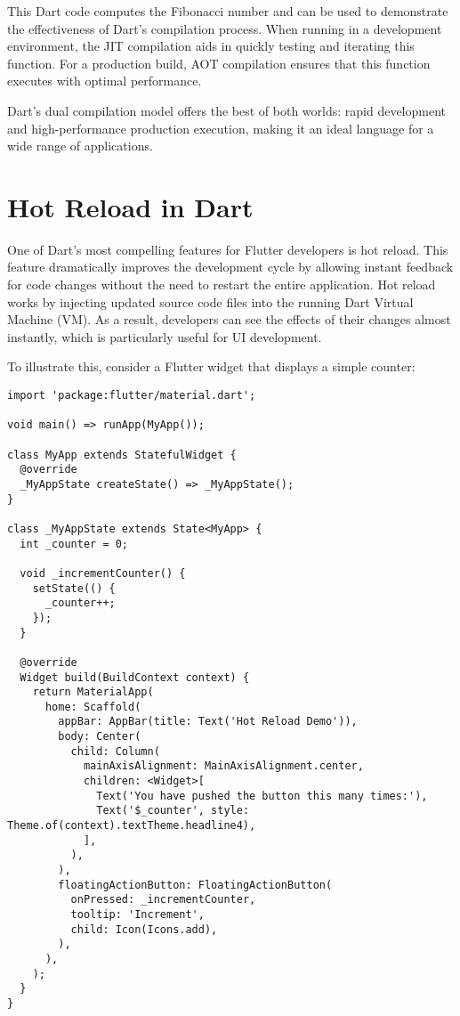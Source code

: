 \documentclass{book}
\begin{document}
This Dart code computes the Fibonacci number and can be used to demonstrate the effectiveness of Dart's compilation process. When running in a development environment, the JIT compilation aids in quickly testing and iterating this function. For a production build, AOT compilation ensures that this function executes with optimal performance.

Dart's dual compilation model offers the best of both worlds: rapid development and high-performance production execution, making it an ideal language for a wide range of applications.



\chapter{Hot Reload in Dart}

One of Dart's most compelling features for Flutter developers is hot reload. This feature dramatically improves the development cycle by allowing instant feedback for code changes without the need to restart the entire application. Hot reload works by injecting updated source code files into the running Dart Virtual Machine (VM). As a result, developers can see the effects of their changes almost instantly, which is particularly useful for UI development.

To illustrate this, consider a Flutter widget that displays a simple counter:

\begin{lstlisting}[style=dartstyle]
import 'package:flutter/material.dart';

void main() => runApp(MyApp());

class MyApp extends StatefulWidget {
  @override
  _MyAppState createState() => _MyAppState();
}

class _MyAppState extends State<MyApp> {
  int _counter = 0;

  void _incrementCounter() {
    setState(() {
      _counter++;
    });
  }

  @override
  Widget build(BuildContext context) {
    return MaterialApp(
      home: Scaffold(
        appBar: AppBar(title: Text('Hot Reload Demo')),
        body: Center(
          child: Column(
            mainAxisAlignment: MainAxisAlignment.center,
            children: <Widget>[
              Text('You have pushed the button this many times:'),
              Text('$_counter', style: Theme.of(context).textTheme.headline4),
            ],
          ),
        ),
        floatingActionButton: FloatingActionButton(
          onPressed: _incrementCounter,
          tooltip: 'Increment',
          child: Icon(Icons.add),
        ),
      ),
    );
  }
}
\end{lstlisting}
\end{document}
